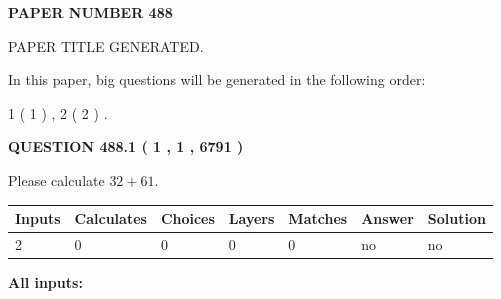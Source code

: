 \documentclass[12pt]{article}
\begin{document}
   
   
   
\newpage 
\setcounter{page}{ 
   488001 } 
   
   
   
   
 {\textbf{ \Large{ PAPER NUMBER  488  }}}
   
   
\vspace{0.2in}
   
   
   
   
   
   
   
   
 \vspace{0.2in}
 
 
 
 
   
   
 PAPER TITLE GENERATED.
   
   
   
\vspace{0.2in}
   
In this paper, big questions will be generated in the following order: 
   
   
   1 ( 1 )
 ,
   2 ( 2 )
 .
  
\vspace{0.2in}
  
{\textbf{\Large{QUESTION
488.1 
 ( 1 , 1 , 6791 )
}}}
  
  
 
Please calculate $ %
32 +  %
61 $.
 
 
   
   
   
   
\noindent\begin{tabular}{|l|l|l|l|l|l|l|}
 \hline
Inputs & Calculates & Choices & Layers & Matches & Answer & Solution \\ \hline
 2  & 
 0  & 
 0
  & 
 0  & 
 0  & 
  no & 
  no 
  \\ \hline
 \end{tabular}
   
   
   
   
\noindent{}
   
   
   
   
\noindent\vspace{0.1in}\hspace{-0.08in} {\textbf{\Large{All inputs: }}}
   
   
  
\end{document}
